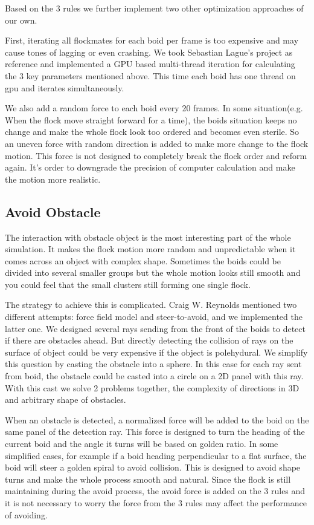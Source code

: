 Based on the 3 rules we further implement two other optimization approaches of our own. 

First, iterating all flockmates for each boid per frame is too expensive and may cause tones of lagging or even crashing. We took Sebastian Lague’s project as reference and implemented a GPU based multi-thread iteration for calculating the 3 key parameters mentioned above. This time each boid has one thread on gpu and iterates simultaneously. 

We also add a random force to each boid every 20 frames. In some situation(e.g. When the flock move straight forward for a time), the boids situation keeps no change and make the whole flock look too ordered and becomes even sterile. So an uneven force with random direction is added to make more change to the flock motion. This force is not designed to completely break the flock order and reform again. It’s order to downgrade the precision of computer calculation and make the motion more realistic.

\subsection{Avoid Obstacle}

The interaction with obstacle object is the most interesting part of the whole simulation. It makes the flock motion more random and unpredictable when it comes across an object with complex shape. Sometimes the boids could be divided into several smaller groups but the whole motion looks still smooth and you could feel that the small clusters still forming one single flock. 

The strategy to achieve this is complicated. Craig W. Reynolds mentioned two different attempts: force field model and steer-to-avoid, and we implemented the latter one. We designed several rays sending from the front of the boids to detect if there are obstacles ahead. But directly detecting the collision of rays on the surface of object could be very expensive if the object is polehydural. We simplify this question by casting the obstacle into a sphere. In this case for each ray sent from boid, the obstacle could be casted into a circle on a 2D panel with this ray. With this cast we solve 2 problems together, the complexity of directions in 3D and arbitrary shape of obstacles. 

When an obstacle is detected, a normalized force will be added to the boid on the same panel of the detection ray. This force is designed to turn the heading of the current boid and the angle it turns will be based on golden ratio. In some simplified cases, for example if a boid heading perpendicular to a flat surface, the boid will steer a golden spiral to avoid collision. This is designed to avoid shape turns and make the whole process smooth and natural. Since the flock is still maintaining during the avoid process, the avoid force is added on the 3 rules and it is not necessary to worry the force from the 3 rules may affect the performance of avoiding.


